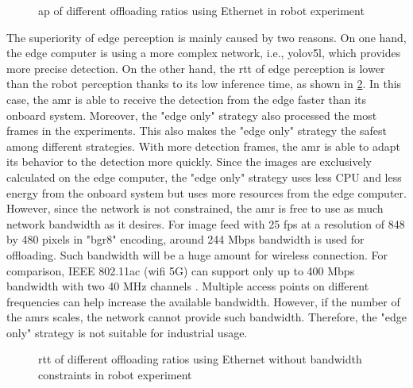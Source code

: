 \begin{figure}
    \centering
    
    \caption{\acrshort{ap} of different offloading ratios using Ethernet in robot experiment}
    \label{fig:robot_exp_ap}
\end{figure}

The superiority of edge perception is mainly caused by two reasons. On one hand, the edge computer is using a more complex network, i.e., \gls{yolo}v5l, which provides more precise detection. On the other hand, the \gls{rtt} of edge perception is lower than the robot perception thanks to its low inference time, as shown in \cref{fig:robot_exp_rtt_320}. In this case, the \gls{amr} is able to receive the detection from the edge faster than its onboard system. Moreover, the "edge only" strategy also processed the most frames in the experiments. This also makes the "edge only" strategy the safest among different strategies. With more detection frames, the \gls{amr} is able to adapt its behavior to the detection more quickly. Since the images are exclusively calculated on the edge computer, the "edge only" strategy uses less CPU and less energy from the onboard system but uses more resources from the edge computer. However, since the network is not constrained, the \gls{amr} is free to use as much network bandwidth as it desires. For image feed with 25 \gls{fps} at a resolution of 848 by 480 pixels in "bgr8" encoding, around 244 Mbps bandwidth is used for offloading. Such bandwidth will be a huge amount for wireless connection. For comparison, IEEE 802.11ac (\gls{wifi} 5G) can support only up to 400 Mbps bandwidth with two 40 MHz channels \cite{IntelCorporation2021}. Multiple access points on different frequencies can help increase the available bandwidth. However, if the number of the \glspl{amr} scales, the network cannot provide such bandwidth. Therefore, the "edge only" strategy is not suitable for industrial usage.

\begin{figure}
    \centering
    
    \caption{\acrshort{rtt} of different offloading ratios using Ethernet without bandwidth constraints in robot experiment}
    \label{fig:robot_exp_rtt_320}
\end{figure}


